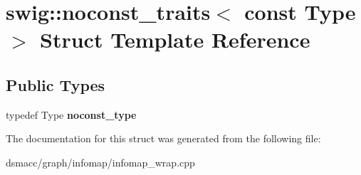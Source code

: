 \hypertarget{structswig_1_1noconst__traits_3_01const_01Type_01_4}{}\section{swig\+:\+:noconst\+\_\+traits$<$ const Type $>$ Struct Template Reference}
\label{structswig_1_1noconst__traits_3_01const_01Type_01_4}
\subsection*{Public Types}
\begin{DoxyCompactItemize}
\item 
\mbox{\label{structswig_1_1noconst__traits_3_01const_01Type_01_4_a47a8b24d65b72185304a9e51211f721f}} 
typedef Type {\bfseries noconst\+\_\+type}
\end{DoxyCompactItemize}


The documentation for this struct was generated from the following file\+:\begin{DoxyCompactItemize}
\item 
dsmacc/graph/infomap/infomap\+\_\+wrap.\+cpp\end{DoxyCompactItemize}
